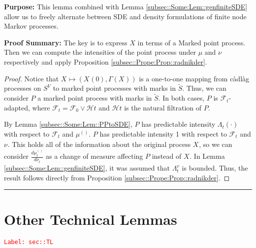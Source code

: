 \documentclass[12pt]{article}
\newcommand{\mc}{\mathcal}
\newcommand{\tr}{\textcolor{red}}
\newcommand{\labe}[1]{\tr{\texttt{Label: #1}}}
\newcommand{\purpose}{\textbf{Purpose: }}
\newcommand{\pfsum}{\textbf{Proof Summary: }}
\newcommand{\ind}{\hspace{24pt}}
\newcommand{\lin}{\rule{\linewidth}{0.4 pt}}
\renewcommand{\v}{v}							%
\renewcommand{\S}{S}							%
\renewcommand{\t}{t}							%
\newcommand{\F}{\mc{F}}							%
\newcommand{\FH}{\mc{H}}						%
\newcommand{\X}{X}								%
\newcommand{\vind}[1]{^{#1}}					%
\newcommand{\carp}[1]{^{#1}}					%
\newcommand{\vsi}[1]{^{#1}}						%
\newcommand{\cind}[1]{_{#1}}					%
\newcommand{\tp}[1]{(#1)}						%
\newcommand{\tip}[1]{#1}						%
\newcommand{\ts}[1]{_{#1}}						%
\newcommand{\sln}[1]{^{(#1)}}					%
\newcommand{\alt}[1]{\widetilde{#1}}			%
\newcommand{\m}{\mu}							%
\newcommand{\mm}{\nu}							%
\newcommand{\pmap}{\Gamma}						%
\newcommand{\rp}{P}								%
\newcommand{\ratee}{\Lambda}					%
\begin{document}
\purpose This lemma combined with Lemma \ref{subsec::Some:Lem::genfiniteSDE} allow us to freely alternate between SDE and density formulations of finite node Markov processes.

\pfsum The key is to express \(\X\) in terms of a Marked point process. Then we can compute the intensities of the point process under \(\m\) and \(\mm\) respectively and apply Proposition \ref{subsec::Prope:Prop::radnikder}.

\begin{proof}
Notice that \(\X\cind{}\tip{} \mapsto (\X\cind{}\tp{0},\pmap(\X\cind{}\tip{}))\) is a one-to-one mapping from c\`adl\`ag processes on \(\S\carp{V}\) to marked point processes with marks in \(\alt{\S}\). Thus, we can consider \(\rp\) a marked point process with marks in \(\alt{\S}\). In both cases, \(\rp\) is \(\F\vsi{}\ts{\t}\)-adapted, where \(\F\vsi{}\ts{\t} = \F\vsi{}\ts{0}\vee \FH{}{\t}\) and \(\FH{}{\t}\) is the natural filtration of \(\rp\).

\ind By Lemma \ref{subsec::Some:Lem::PPtoSDE}, \(\rp\) has predictable intensity \(\ratee\ts{\t}(\cdot)\) with respect to \(\F\vsi{}\ts{\t}\) and \(\m\sln{}\ts{}\). \(\rp\) has predictable intensity 1 with respect to \(\F\vsi{}\ts{\t}\) and \(\mm\vind{}\ts{}\). This holds all of the information about the original process \(\X\cind{}\tip{}\), so we can consider \(\frac{d\m\sln{}\ts{\t}}{d\mm\vind{}\ts{\t}}\) as a change of measure affecting \(\rp\) instead of \(\X\cind{}\tip{}\). In Lemma \ref{subsec::Some:Lem::genfiniteSDE}, it was assumed that \(\ratee\ts{\t}\vind{\v}\) is bounded. Thus, the result follows directly from Proposition \ref{subsec::Prope:Prop::radnikder}. 
\end{proof}

\lin
\section{Other Technical Lemmas}
\label{sec::TL}\labe{sec::TL}
\end{document}
